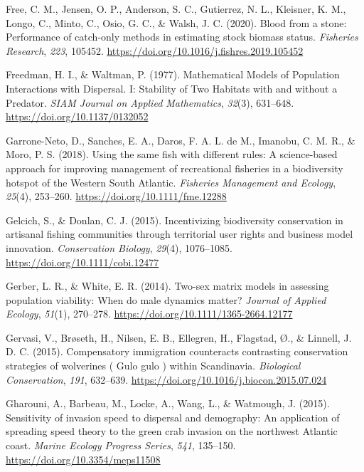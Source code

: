 \documentclass[
]{article}
\newlength{\cslhangindent}
\newlength{\cslentryspacingunit} %
\newenvironment{CSLReferences}[2] %
 {%
  \setlength{\parindent}{0pt}
  \ifodd #1
  \let\oldpar\par
  \def\par{\hangindent=\cslhangindent\oldpar}
  \fi
  \setlength{\parskip}{#2\cslentryspacingunit}
 }%
 {}
\begin{document}
\begin{CSLReferences}{1}{0}
\leavevmode{}%
Free, C. M., Jensen, O. P., Anderson, S. C., Gutierrez, N. L., Kleisner, K. M., Longo, C., Minto, C., Osio, G. C., \& Walsh, J. C. (2020). Blood from a stone: {Performance} of catch-only methods in estimating stock biomass status. \emph{Fisheries Research}, \emph{223}, 105452. \url{https://doi.org/10.1016/j.fishres.2019.105452}

\leavevmode{}%
Freedman, H. I., \& Waltman, P. (1977). Mathematical {Models} of {Population} {Interactions} with {Dispersal}. {I}: {Stability} of {Two} {Habitats} with and without a {Predator}. \emph{SIAM Journal on Applied Mathematics}, \emph{32}(3), 631--648. \url{https://doi.org/10.1137/0132052}

\leavevmode{}%
Garrone-Neto, D., Sanches, E. A., Daros, F. A. L. de M., Imanobu, C. M. R., \& Moro, P. S. (2018). Using the same fish with different rules: {A} science-based approach for improving management of recreational fisheries in a biodiversity hotspot of the {Western} {South} {Atlantic}. \emph{Fisheries Management and Ecology}, \emph{25}(4), 253--260. \url{https://doi.org/10.1111/fme.12288}

\leavevmode{}%
Gelcich, S., \& Donlan, C. J. (2015). Incentivizing biodiversity conservation in artisanal fishing communities through territorial user rights and business model innovation. \emph{Conservation Biology}, \emph{29}(4), 1076--1085. \url{https://doi.org/10.1111/cobi.12477}

\leavevmode{}%
Gerber, L. R., \& White, E. R. (2014). Two-sex matrix models in assessing population viability: When do male dynamics matter? \emph{Journal of Applied Ecology}, \emph{51}(1), 270--278. \url{https://doi.org/10.1111/1365-2664.12177}

\leavevmode{}%
Gervasi, V., Brøseth, H., Nilsen, E. B., Ellegren, H., Flagstad, Ø., \& Linnell, J. D. C. (2015). Compensatory immigration counteracts contrasting conservation strategies of wolverines ( {Gulo} gulo ) within {Scandinavia}. \emph{Biological Conservation}, \emph{191}, 632--639. \url{https://doi.org/10.1016/j.biocon.2015.07.024}

\leavevmode{}%
Gharouni, A., Barbeau, M., Locke, A., Wang, L., \& Watmough, J. (2015). Sensitivity of invasion speed to dispersal and demography: An application of spreading speed theory to the green crab invasion on the northwest {Atlantic} coast. \emph{Marine Ecology Progress Series}, \emph{541}, 135--150. \url{https://doi.org/10.3354/meps11508}


\end{CSLReferences}
\end{document}
